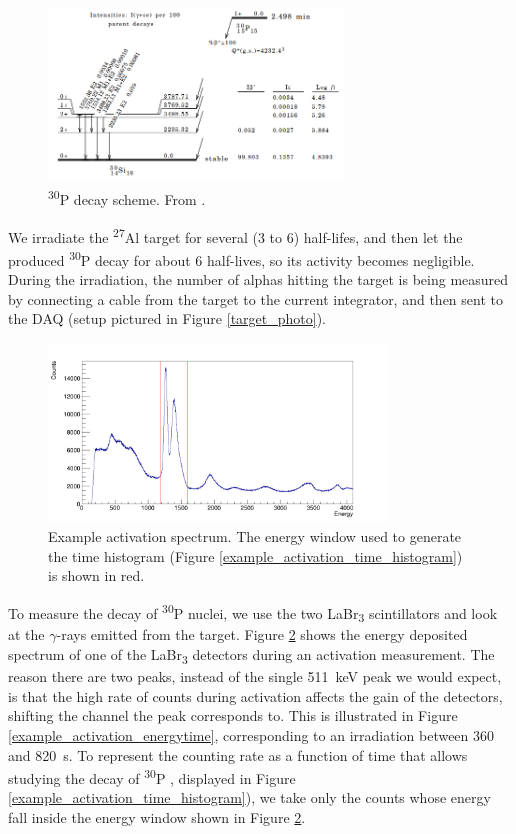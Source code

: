 \documentclass[a4paper,12pt]{report}
\newcommand{\Aliso}{\textsuperscript{27}Al }
\newcommand{\Piso}{\textsuperscript{30}P }
\begin{document}
\begin{figure}[H]
	\centering
	\includegraphics[width=0.7\textwidth]{Piso_decay_scheme.png}
	\caption{\Piso decay scheme.
	From \cite{nucleardatasheets}.}
	\label{Piso_decay_scheme}
\end{figure}

We irradiate the \Aliso target for several (3 to 6) half-lifes, and then let the produced \Piso decay for about 6 half-lives, so its activity becomes negligible.
During the irradiation, the number of alphas hitting the target is being measured by connecting a cable from the target to the current integrator, and then sent to the DAQ (setup pictured in Figure \ref{target_photo}).

\begin{figure}[H]
	\centering
	\includegraphics[width=0.80\textwidth]{example_activation_energy_histogram.png}
	\caption{Example activation spectrum.
	The energy window used to generate the time histogram (Figure \ref{example_activation_time_histogram}) is shown in red.}	%
	\label{example_activation_energy_histogram}
\end{figure}

To measure the decay of \Piso nuclei, we use the two LaBr\textsubscript{3} scintillators and look at the $\gamma$-rays emitted from the target.
Figure \ref{example_activation_energy_histogram} shows the energy deposited spectrum of one of the LaBr\textsubscript{3} detectors during an activation measurement.
The reason there are two peaks, instead of the single \qty{511}{\keV} peak we would expect, is that the high rate of counts during activation affects the gain of the detectors, shifting the channel the peak corresponds to.
This is illustrated in Figure \ref{example_activation_energytime}, corresponding to an irradiation between 360 and \qty{820}{\s}.
To represent the counting rate as a function of time that allows studying the decay of \Piso, displayed in Figure \ref{example_activation_time_histogram}), we take only the counts whose energy fall inside the energy window shown in Figure \ref{example_activation_energy_histogram}.
\end{document}
